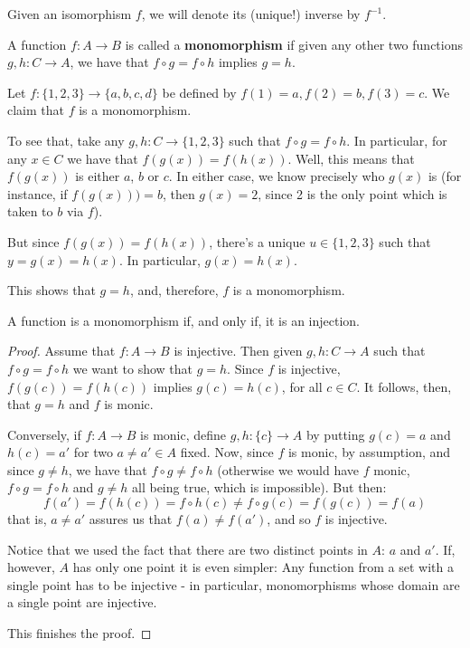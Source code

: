 \begin{df}
	Given an isomorphism $f$, we will denote its (unique!) inverse by $f^{-1}$.
\end{df}

\begin{df}
	A function $f:A\to B$ is called a \textbf{monomorphism} if given any other two functions $g,h:C\to A$, we have that $f\circ g=f\circ h$ implies $g=h$.
\end{df}

\begin{ex}
	Let $f:\{1,2,3\}\to \{a,b,c,d\}$ be defined by $f(1)=a, f(2)=b,f(3)=c$. We claim that $f$ is a monomorphism.
	
	To see that, take any $g,h:C\to\{1,2,3\}$ such that $f\circ g=f\circ h$. In particular, for any $x\in C$ we have that $f(g(x))=f(h(x))$. Well, this means that $f(g(x))$ is either $a$, $b$ or $c$. In either case, we know precisely who $g(x)$ is (for instance, if $f(g(x)))=b$, then $g(x)=2$, since 2 is the only point which is taken to $b$ via $f$).
	
	But since $f(g(x))=f(h(x))$, there's a unique $u\in\{1,2,3\}$ such that $y=g(x)=h(x)$. In particular, $g(x)=h(x)$.
	
	This shows that $g=h$, and, therefore, $f$ is a monomorphism.
\end{ex}

\begin{theorem}\label{thm:mono is inj}
A function is a monomorphism if, and only if, it is an injection.
\end{theorem}
\begin{proof}
	Assume that \(f:A\to B\) is injective. Then given \(g,h:C\to A\) such that \(f\circ g= f\circ h\) we want to show that $g=h$. Since \(f\) is injective, \(f(g(c))=f(h(c))\) implies \(g(c)=h(c)\), for all \(c\in C\). It follows, then, that \(g= h\) and \(f\) is monic.
	
	\bigskip
	Conversely, if \(f:A\to B\) is monic, define \(g,h:\{c\}\to A\) by putting \(g(c)=a\) and \(h(c)=a'\) for two \(a\neq a'\in A\) fixed. Now, since \(f\) is monic, by assumption, and since \(g\neq h\), we have that \(f\circ g\neq f\circ h\) (otherwise we would have $f$ monic, $f\circ g=f\circ h$ and $g\neq h$ all being true, which is impossible). But then:
	\[f(a')=f(h(c))=f\circ h(c)\neq f\circ g(c)=f(g(c))=f(a)\]that is, \(a\neq a'\) assures us that \(f(a)\neq f(a')\), and so \(f\) is injective.
	
	Notice that we used the fact that there are two distinct points in $A$: $a$ and $a'$. If, however, $A$ has only one point it is even simpler: Any function from a set with a single point has to be injective - in particular, monomorphisms whose domain are a single point are injective.
	
	This finishes the proof.
\end{proof}

